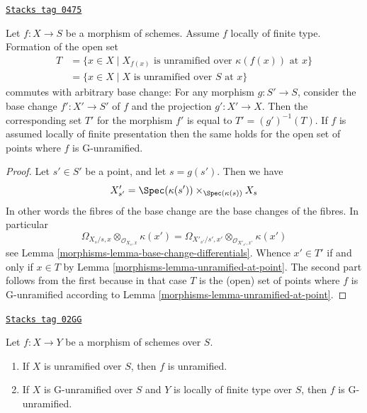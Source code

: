 \begin{lemma}
\label{morphisms-lemma-set-points-where-fibres-unramified}
\href{https://stacks.math.columbia.edu/tag/0475}{\texttt{Stacks tag 0475}}

Let $f : X \to S$ be a morphism of schemes.
Assume $f$ locally of finite type. Formation of the open set
\begin{align*}
T
& =
\{x \in X \mid X_{f(x)}\text{ is unramified over }\kappa(f(x))\text{ at }x\} \\
& =
\{x \in X \mid X\text{ is unramified over }S\text{ at }x\}
\end{align*}
commutes with arbitrary base change:
For any morphism $g : S' \to S$, consider
the base change $f' : X' \to S'$ of $f$ and the
projection $g' : X' \to X$. Then the corresponding
set $T'$ for the morphism $f'$ is equal to $T' = (g')^{-1}(T)$.
If $f$ is assumed locally of finite presentation then the same holds
for the open set of points where $f$ is G-unramified.
\end{lemma}

\begin{proof}

Let $s' \in S'$ be a point, and let $s = g(s')$. Then we have
$$
X'_{s'} =
\Spec(\kappa(s')) \times_{\Spec(\kappa(s))} X_s
$$
In other words the fibres of the base change are the base changes
of the fibres. In particular
$$
\Omega_{X_s/s, x} \otimes_{\mathcal{O}_{X_s, x}} \kappa(x')
=
\Omega_{X'_{s'}/s', x'} \otimes_{\mathcal{O}_{X'_{s'}, x'}} \kappa(x')
$$
see
Lemma \ref{morphisms-lemma-base-change-differentials}.
Whence $x' \in T'$ if and only if $x \in T$ by
Lemma \ref{morphisms-lemma-unramified-at-point}.
The second part follows from the first because in that case
$T$ is the (open) set of points where $f$ is G-unramified according to
Lemma \ref{morphisms-lemma-unramified-at-point}.
\end{proof}

\begin{lemma}
\label{morphisms-lemma-unramified-permanence}
\href{https://stacks.math.columbia.edu/tag/02GG}{\texttt{Stacks tag 02GG}}

Let $f : X \to Y$ be a morphism of schemes over $S$.
\begin{enumerate}
\item If $X$ is unramified over $S$, then $f$ is unramified.
\item If $X$ is G-unramified over $S$ and $Y$ is locally of finite type
over $S$, then $f$ is G-unramified.
\end{enumerate}
\end{lemma}

